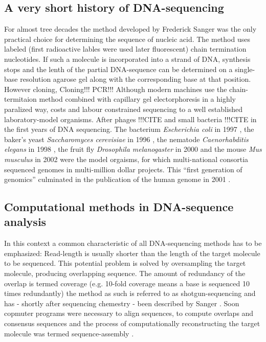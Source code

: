 \subsection{A very short history of DNA-sequencing}
\label{his-seq}

For almost tree decades the method developed by Frederick Sanger
\cite{pmid271968} was the only practical choice for determining the
sequence of nucleic acid. The method uses labeled (first radioactive
lables were used later fluorescent) chain termination nucleotides. If
such a molecule is incorporated into a strand of DNA, synthesis stops
and the lenth of the partial DNA-sequence can be determined on a
single-base resolution agarose gel along with the corresponding base
at that position. However cloning, Cloning!!! PCR!!!
Although modern machines use the chain-termitaion method combined with
capillary gel electorphoresis \cite{pmid2326186} in a highly paralized
way, costs and labour constrained sequencing to a well established
laboratory-model organisms. After phages !!!CITE and small bacteria
!!!CITE in the first years of DNA sequencing. The bacterium
\textit{Escherichia coli} in 1997 \cite{pmid9278503}, the baker's
yeast \textit{Saccharomyces cerevisiae} in 1996 \cite{pmid8849441},
the nematode \textit{Caenorhabditis elegans} in 1998
\cite{pmid9851916}, the fruit fly \textit{Drosophila melanogaster} in
2000 \cite{adams2000genome} and the mouse \textit{Mus musculus} in
2002 \cite{pmid12466850} were the model orgaisms, for which
multi-national consortia sequenced genomes in multi-million dollar
projects. This ``first generation of genomics'' culminated in the
publication of the human genome in 2001 \cite{pmid11181995}.

\subsection{Computational methods in DNA-sequence analysis}
\label{sec:comp-meth-dna}

In this context a common characteristic of all DNA-sequencing methods
has to be emphasized: Read-length is usually shorter than the length
of the target molecule to be sequenced. This potential problem is
solved by oversampling the target molecule, producing overlapping
sequence. The amount of redundancy of the overlap is termed coverage
(e.g. 10-fold coverage means a base is sequenced 10 times redundantly)
the method as such is referred to as shotgun-sequencing and has -
shortly after sequencing chemestry - been described by Sanger
\cite{pmid6260957}. Soon copmuter programs were necessary to align
sequences, to compute overlaps and consensus sequences
\cite{pmid461197} and the process of computationally reconstructing
the target molecule was termed sequence-assembly \cite{pmid6251542}.

